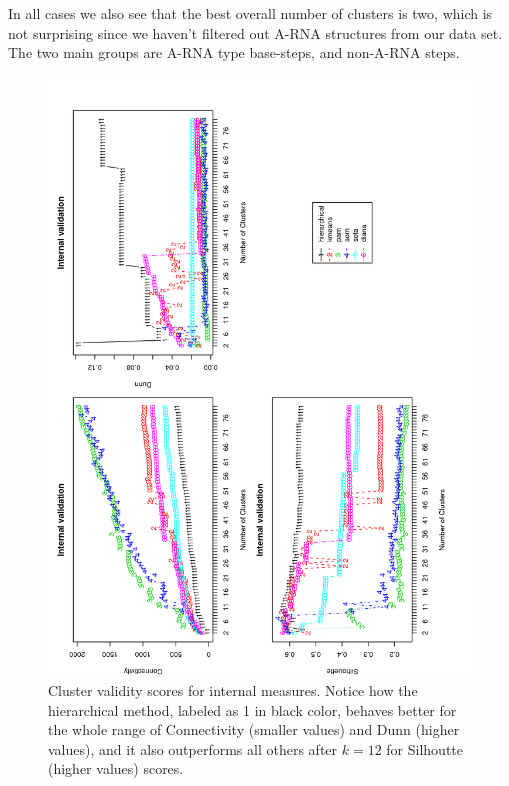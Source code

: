In all cases  we also see that the best overall  number of clusters is
two, which is not surprising since we haven't filtered out A-RNA
structures from our  data set. The two main  groups are A-RNA
type base-steps, and non-A-RNA steps.

\begin{figure}
 \centering
\includegraphics[angle=0, scale=0.38]{Chapter2/STval_int.png}
\caption{Cluster validity scores for internal measures. Notice how the
  hierarchical method, labeled as 1 in black color,
  behaves better for the whole range of Connectivity (smaller values)
  and Dunn (higher values),
  and it also outperforms all others after $k=12$ for Silhoutte
  (higher values) scores.}
 \label{fig:internal}
\end{figure}

